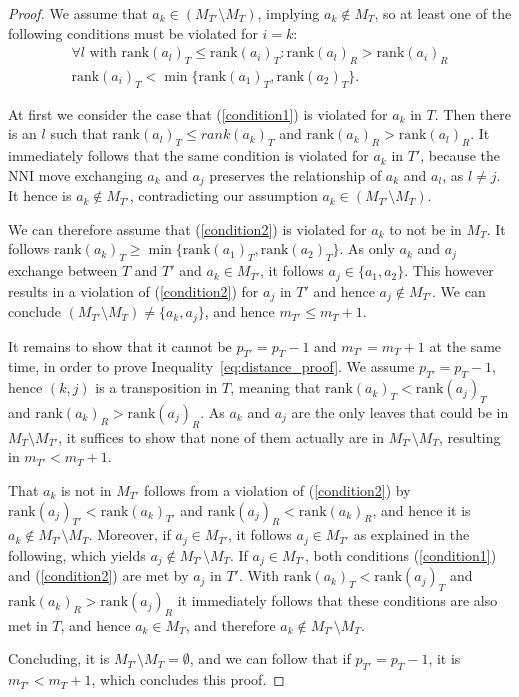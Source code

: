 \documentclass[11pt]{amsart}
\newcommand{\rank}{\mathrm{rank}}
\newcommand{\nni}{\mathrm{NNI}}
\begin{document}
\begin{proof}
	We assume that $a_k \in (M_{T'} \setminus M_T)$, implying $a_k \notin M_T$, so at least one of the following conditions must be violated for $i = k$:
	\setcounter{equation}{0} %
	\renewcommand{\theequation}{C\arabic{equation}}
	\begin{align}
		\forall l \text{ with } \rank(a_l)_T \leq \rank(a_i)_T: \rank(a_l)_R > \rank(a_i)_R \label{condition1}\\
		\rank(a_i)_T < \min\{\rank(a_1)_T, \rank(a_2)_T\}.
		\label{condition2}
	\end{align}
	\setcounter{equation}{1}
	\renewcommand{\theequation}{\arabic{equation}}

	At first we consider the case that (\ref{condition1}) is violated for $a_k$ in $T$.
	Then there is an $l$ such that $\rank(a_l)_T \leq rank(a_k)_T$ and $\rank(a_k)_R > \rank(a_l)_R$.
	It immediately follows that the same condition is violated for $a_k$ in $T'$, because the $\nni$ move exchanging $a_k$ and $a_j$ preserves the relationship of $a_k$ and $a_l$, as $l \neq j$.
	It hence is $a_k \notin M_{T'}$, contradicting our assumption $a_k \in (M_{T'} \setminus M_T)$.

	We can therefore assume that (\ref{condition2}) is violated for $a_k$ to not be in $M_T$.
	It follows $\rank(a_k)_T \geq \min\{\rank(a_1)_T, \rank(a_2)_T\}$.
	As only $a_k$ and $a_j$ exchange between $T$ and $T'$ and $a_k \in M_{T'}$, it follows $a_j \in \{a_1, a_2\}$.
	This however results in a violation of (\ref{condition2}) for $a_j$ in $T'$ and hence $a_j \notin M_{T'}$.
	We can conclude $(M_{T'} \setminus M_T) \neq \{a_k, a_j\}$, and hence $m_{T'} \leq m_T + 1$.

	It remains to show that it cannot be $p_{T'} = p_T - 1$ and $m_{T'} = m_T + 1$ at the same time, in order to prove Inequality~\ref{eq:distance_proof}.
	We assume $p_{T'} = p_T - 1$, hence $(k,j)$ is a transposition in $T$, meaning that $\rank(a_k)_T < \rank(a_j)_T$ and $\rank(a_k)_R > \rank(a_j)_R$.
	As $a_k$ and $a_j$ are the only leaves that could be in $M_T \setminus M_{T'}$, it suffices to show that none of them actually are in $M_{T'} \setminus M_T$, resulting in $m_{T'} < m_T + 1$.

	That $a_k$ is not in $M_{T'}$ follows from a violation of (\ref{condition2}) by $\rank(a_j)_{T'} < \rank(a_k)_{T'}$ and $\rank(a_j)_R < \rank(a_k)_R$, and hence it is $a_k \notin M_{T'} \setminus M_T$.
	Moreover, if $a_j \in M_{T'}$, it follows $a_j \in M_{T'}$ as explained in the following, which yields $a_j \notin M_{T'} \setminus M_T$.
	If $a_j \in M_{T'}$, both conditions (\ref{condition1}) and (\ref{condition2}) are met by $a_j$ in $T'$.
	With $\rank(a_k)_T < \rank(a_j)_T$ and $\rank(a_k)_R > \rank(a_j)_R$ it immediately follows that these conditions are also met in $T$, and hence $a_k \in M_T$, and therefore $a_k \notin M_{T'} \setminus M_T$.

	Concluding, it is $M_{T'} \setminus M_T = \emptyset$, and we can follow that if $p_{T'} = p_T - 1$, it is $m_{T'} < m_T + 1$, which concludes this proof.
\end{proof}
\end{document}
